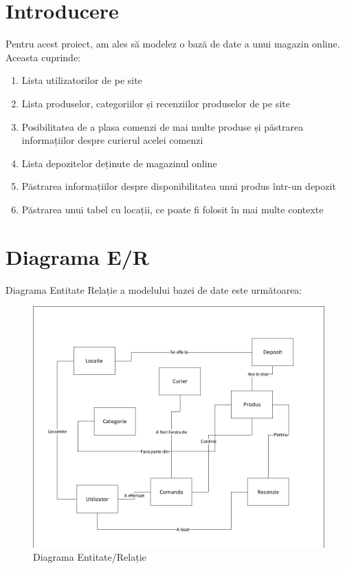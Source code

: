 \documentclass[12pt]{article}
\begin{document}
\maketitle
\pagebreak

\tableofcontents
\pagebreak

\section{Introducere}
Pentru acest proiect, am ales să modelez o bază de date a unui magazin online. Aceasta cuprinde:
\begin{enumerate}
  \item Lista utilizatorilor de pe site
  \item Lista produselor, categoriilor și recenziilor produselor de pe site
  \item Posibilitatea de a plasa comenzi de mai multe produse și păstrarea informațiilor despre curierul acelei comenzi
  \item Lista depozitelor deținute de magazinul online
  \item Păstrarea informațiilor despre disponibilitatea unui produs într-un depozit
  \item Păstrarea unui tabel cu locații, ce poate fi folosit în mai multe contexte
\end{enumerate}

\pagebreak

\section{Diagrama E/R}

Diagrama Entitate Relație a modelului bazei de date este următoarea:

\begin{figure}[htp]
  \centering
  \includegraphics[width=1\linewidth]{EntitateRelatie.pdf}
  \caption{Diagrama Entitate/Relație}
\end{figure}
\end{document}
